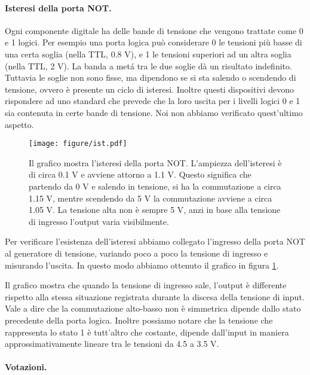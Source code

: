 \paragraph{Isteresi della porta NOT.}

Ogni componente digitale ha delle bande di tensione che vengono trattate come 0 e 1 logici. Per esempio
una porta logica può considerare 0 le tensioni più basse di una certa soglia (nella TTL, 0.8 V), 
e 1 le tensioni superiori ad un altra soglia (nella TTL, 2 V). La banda a metá tra le due soglie
dà un risultato indefinito. Tuttavia le soglie non sono fisse, ma dipendono se si sta salendo o
scendendo di tensione, ovvero è presente un ciclo di isteresi. Inoltre questi dispositivi
devono rispondere ad uno standard che prevede che la loro uscita per i livelli logici 0 e 1 sia
contenuta in certe bande di tensione. Noi non abbiamo verificato quest'ultimo aspetto.

\begin{figure}[b!]
    \centering
    \texttt{[image: figure/ist.pdf]}
    \caption{Il grafico mostra l'isteresi della porta NOT. L'ampiezza dell'isteresi è di circa 0.1 V e avviene attorno a 1.1 V.
        Questo significa che partendo da 0 V e salendo in tensione, si ha la commutazione a circa 1.15 V, mentre
        scendendo da 5 V la commutazione avviene a circa 1.05 V. La tensione alta non è sempre 5 V, anzi in base alla tensione di ingresso
        l'output varia visibilmente.}
    \label{fig:ist9}
\end{figure}

Per verificare l'esistenza dell'isteresi
abbiamo collegato l'ingresso della porta NOT al generatore di tensione, variando poco a poco la tensione
di ingresso e misurando l'uscita. In questo modo abbiamo ottenuto il grafico in figura \ref{fig:ist9}.

Il grafico mostra che quando la tensione di ingresso sale, l'output è differente rispetto alla stessa situazione
registrata durante la discesa della tensione di input. Vale a dire che la commutazione alto-basso non è simmetrica
dipende dallo stato precedente della porta logica. Inoltre possiamo notare che la tensione che rappresenta lo stato
1 è tutt'altro che costante, dipende dall'input in maniera approssimativamente lineare tra le tensioni da 4.5 a 3.5 V.

\paragraph{Votazioni.}

